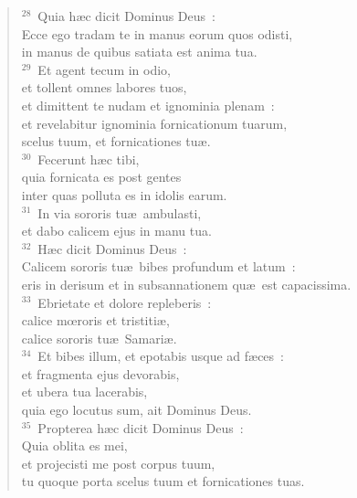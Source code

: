 \begin{verse}${}^{28}$~Quia h\ae c dicit Dominus Deus~:\\ Ecce ego tradam te in manus eorum quos odisti,\\ in manus de quibus satiata est anima tua.\\
${}^{29}$~Et agent tecum in odio,\\ et tollent omnes labores tuos,\\ et dimittent te nudam et ignominia plenam~:\\ et revelabitur ignominia fornicationum tuarum,\\ scelus tuum, et fornicationes tu\ae .\\
${}^{30}$~Fecerunt h\ae c tibi,\\ quia fornicata es post gentes\\ inter quas polluta es in idolis earum.\\
${}^{31}$~In via sororis tu\ae\ ambulasti,\\ et dabo calicem ejus in manu tua.\\
${}^{32}$~H\ae c dicit Dominus Deus~:\\ Calicem sororis tu\ae\ bibes profundum et latum~:\\ eris in derisum et in subsannationem qu\ae\ est capacissima.\\
${}^{33}$~Ebrietate et dolore repleberis~:\\ calice mœroris et tristiti\ae ,\\ calice sororis tu\ae\ Samari\ae .\\
${}^{34}$~Et bibes illum, et epotabis usque ad f\ae ces~:\\ et fragmenta ejus devorabis,\\ et ubera tua lacerabis,\\ quia ego locutus sum, ait Dominus Deus.\\
${}^{35}$~Propterea h\ae c dicit Dominus Deus~:\\ Quia oblita es mei,\\ et projecisti me post corpus tuum,\\ tu quoque porta scelus tuum et fornicationes tuas.\end{verse}


